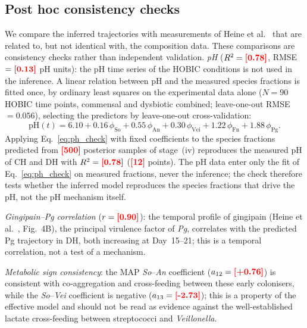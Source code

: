\documentclass[11pt,a4paper]{article}
\newcommand{\TBD}[1]{\textcolor{red}{\textbf{[#1]}}}
\begin{document}
\subsection{Post hoc consistency checks}
\label{sec:validation}

We compare the inferred trajectories with measurements of Heine et al.~\cite{heine2025influence} that are related to, but not identical with, the composition data.
These comparisons are consistency checks rather than independent validation.
\textit{pH} ($R^2=\TBD{0.78}$, RMSE $=\TBD{0.13}$ pH units):
the pH time series of the HOBIC conditions is not used in the inference.
A linear relation between pH and the measured species fractions is fitted once, by ordinary least squares on the experimental data alone ($N=90$ HOBIC time points, commensal and dysbiotic combined; leave-one-out RMSE $=0.056$), selecting the predictors by leave-one-out cross-validation:
\begin{equation}
  \mathrm{pH}(t) = 6.10 + 0.16\,\phi_{\mathrm{So}} + 0.55\,\phi_{\mathrm{An}} + 0.30\,\phi_{\mathrm{Vei}} + 1.22\,\phi_{\mathrm{Fn}} + 1.88\,\phi_{\mathrm{Pg}}.
  \label{eq:ph_check}
\end{equation}
Applying Eq.~\eqref{eq:ph_check} with fixed coefficients to the species fractions predicted from \TBD{500} posterior samples of stage~(iv) reproduces the measured pH of CH and DH with $R^2=\TBD{0.78}$ (\TBD{12} points).
The pH data enter only the fit of Eq.~\eqref{eq:ph_check} on measured fractions, never the inference; the check therefore tests whether the inferred model reproduces the species fractions that drive the pH, not the pH mechanism itself.

\textit{Gingipain--\textit{Pg} correlation} ($r=\TBD{0.90}$):
the temporal profile of gingipain (Heine et al.~\cite{heine2025influence}, Fig.~4B), the principal virulence factor of \textit{Pg}, correlates with the predicted Pg trajectory in DH, both increasing at Day~15--21; this is a temporal correlation, not a test of a mechanism.

\textit{Metabolic sign consistency}:
the MAP \textit{So}--\textit{An} coefficient ($a_{12}=\TBD{+0.76}$) is consistent with co-aggregation and cross-feeding between these early colonisers, while the \textit{So}--\textit{Vei} coefficient is negative ($a_{13}=\TBD{-2.73}$); this is a property of the effective model and should not be read as evidence against the well-established lactate cross-feeding between streptococci and \textit{Veillonella}.
\end{document}
